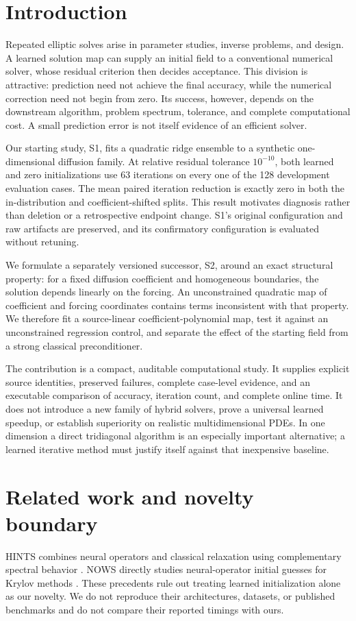 \section{Introduction}
Repeated elliptic solves arise in parameter studies, inverse problems, and design. A learned solution map can supply an initial field to a conventional numerical solver, whose residual criterion then decides acceptance. This division is attractive: prediction need not achieve the final accuracy, while the numerical correction need not begin from zero. Its success, however, depends on the downstream algorithm, problem spectrum, tolerance, and complete computational cost. A small prediction error is not itself evidence of an efficient solver.

Our starting study, S1, fits a quadratic ridge ensemble to a synthetic one-dimensional diffusion family. At relative residual tolerance $10^{-10}$, both learned and zero initializations use 63 iterations on every one of the 128 development evaluation cases. The mean paired iteration reduction is exactly zero in both the in-distribution and coefficient-shifted splits. This result motivates diagnosis rather than deletion or a retrospective endpoint change. S1's original configuration and raw artifacts are preserved, and its confirmatory configuration is evaluated without retuning.

We formulate a separately versioned successor, S2, around an exact structural property: for a fixed diffusion coefficient and homogeneous boundaries, the solution depends linearly on the forcing. An unconstrained quadratic map of coefficient and forcing coordinates contains terms inconsistent with that property. We therefore fit a source-linear coefficient-polynomial map, test it against an unconstrained regression control, and separate the effect of the starting field from a strong classical preconditioner.

The contribution is a compact, auditable computational study. It supplies explicit source identities, preserved failures, complete case-level evidence, and an executable comparison of accuracy, iteration count, and complete online time. It does not introduce a new family of hybrid solvers, prove a universal learned speedup, or establish superiority on realistic multidimensional PDEs. In one dimension a direct tridiagonal algorithm is an especially important alternative; a learned iterative method must justify itself against that inexpensive baseline.

\section{Related work and novelty boundary}
HINTS combines neural operators and classical relaxation using complementary spectral behavior \cite{hints}. NOWS directly studies neural-operator initial guesses for Krylov methods \cite{nows}. These precedents rule out treating learned initialization alone as our novelty. We do not reproduce their architectures, datasets, or published benchmarks and do not compare their reported timings with ours.

